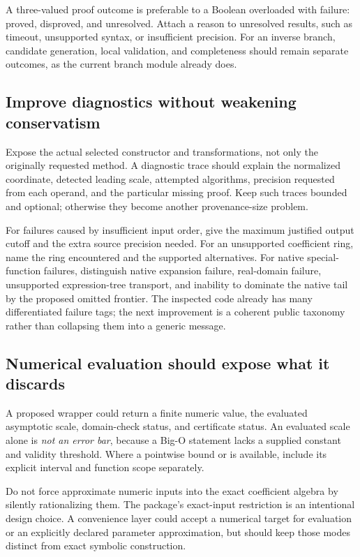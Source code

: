\documentclass[11pt,letterpaper]{article}
\newcommand{\code}[1]{\texttt{\detokenize{#1}}}
\begin{document}
A three-valued proof outcome is preferable to a Boolean overloaded with failure: proved, disproved, and unresolved. Attach a reason to unresolved results, such as timeout, unsupported syntax, or insufficient precision. For an inverse branch, candidate generation, local validation, and completeness should remain separate outcomes, as the current branch module already does.\cite{branches}

\subsection{Improve diagnostics without weakening conservatism}
Expose the actual selected constructor and transformations, not only the originally requested method. A diagnostic trace should explain the normalized coordinate, detected leading scale, attempted algorithms, precision requested from each operand, and the particular missing proof. Keep such traces bounded and optional; otherwise they become another provenance-size problem.

For failures caused by insufficient input order, give the maximum justified output cutoff and the extra source precision needed. For an unsupported coefficient ring, name the ring encountered and the supported alternatives. For native special-function failures, distinguish native expansion failure, real-domain failure, unsupported expression-tree transport, and inability to dominate the native tail by the proposed omitted frontier. The inspected code already has many differentiated failure tags; the next improvement is a coherent public taxonomy rather than collapsing them into a generic message.\cite{core,native,arithmetic}

\subsection{Numerical evaluation should expose what it discards}
A proposed \code{EvaluateApproximation} wrapper could return a finite numeric value, the evaluated asymptotic scale, domain-check status, and certificate status. An evaluated scale alone is \emph{not an error bar}, because a Big-O statement lacks a supplied constant and validity threshold. Where a pointwise bound or \code{InverseCertificate} is available, include its explicit interval and function scope separately.

Do not force approximate numeric inputs into the exact coefficient algebra by silently rationalizing them. The package's exact-input restriction is an intentional design choice. A convenience layer could accept a numerical target for evaluation or an explicitly declared parameter approximation, but should keep those modes distinct from exact symbolic construction.\cite{guide,arithmetic-tests}
\end{document}
